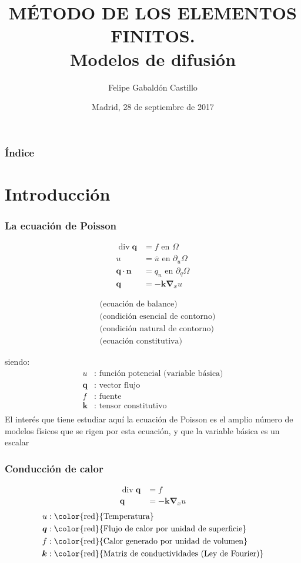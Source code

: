 \documentclass{beamer}
\title[Modelos de difusión]{
MÉTODO DE LOS ELEMENTOS FINITOS. \\
Modelos de difusión}
\author[Felipe Gabaldón]{Felipe Gabaldón Castillo}
\date{Madrid, 28 de septiembre de 2017}
\begin{document}
\begin{frame}
\titlepage
\end{frame}
\begin{frame}
\frametitle{Índice}
\tableofcontents[pausesections]
\end{frame}
\section{Introducción}
\begin{frame}
\frametitle{La ecuación de Poisson}
\parbox{40mm}{
\begin{align*}
\operatorname{div} \bm{q}&=f \textrm{ en }\Omega \\
u&=\overline{u}\textrm{ en } \partial_{u} \Omega \\
\bm{q}\cdot \bm{n}&=q_n \textrm{ en } \partial_{q} \Omega\\
\bm{q}&=-\bm{k} \bm{\nabla}_{x} u
\end{align*}
}
\parbox{50mm}{
\begin{align*}
\mbox{}& \textrm{ (ecuación de balance)} \\
\mbox{}& \textrm{ (condición esencial de contorno)}\\
\mbox{}& \textrm{ (condición natural de contorno)}\\
\mbox{}& \textrm{ (ecuación constitutiva)}
\end{align*}
}
siendo:
\vspace{-5mm}
\begin{align*}
u  &:\textrm{ función potencial (variable básica)} \\
\bm{q}&:\textrm{ vector flujo} \\
f&:\textrm{ fuente} \\
\bm{k}&:\textrm{ tensor constitutivo} \\
\end{align*}
El interés que tiene estudiar aquí la ecuación de Poisson es el
amplio número de modelos físicos que se rigen por esta ecuación, y que
la variable básica es un escalar
\end{frame}
\begin{frame}
\frametitle{Conducción de calor}
\begin{align*}
\operatorname{div} \bm{q}&=f  \\
\bm{q}&=-\bm{k} \bm{\nabla}_{x} u
\end{align*}
\begin{align*}
u  &:\textrm{\color{red}{Temperatura}} \\
\bm{q}&:\textrm{\color{red}{Flujo de calor por unidad de superficie}} \\
f&:\textrm{\color{red}{Calor generado por unidad de volumen}} \\
\bm{k}&:\textrm{\color{red}{Matriz de conductividades (Ley de Fourier)}}
\end{align*}
\end{frame}
\end{document}
